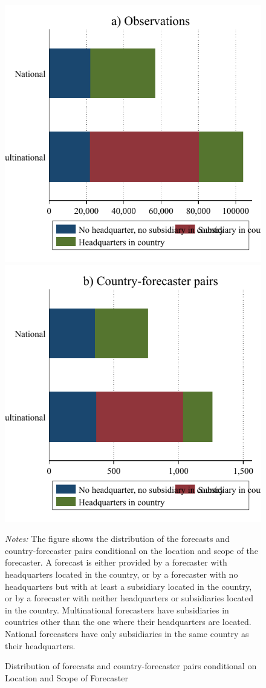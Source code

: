 \documentclass[letterpaper,12pt]{article}
\newenvironment{fignote}{\footnotesize \begin{singlespace} \noindent}{\end{singlespace} \par }
\begin{document}
\begin{figure}[H]
\begin{center}
		\includegraphics[width=.4\linewidth]{../output/figures/hq_sub_obs.pdf}
		\includegraphics[width=.4\linewidth]{../output/figures/hq_sub_pairs.pdf}
\end{center}
	\caption{Distribution of forecasts and country-forecaster pairs conditional on Location and Scope of Forecaster}
	\label{fig:hq_sub_obs}
	\begin{fignote}
		\textit{Notes:} The figure shows the distribution of the forecasts and country-forecaster pairs conditional on the location and scope of the forecaster. A forecast is either provided by a forecaster with headquarters located in the country, or by a forecaster with no headquarters but with at least a subsidiary located in the country, or by a forecaster with neither headquarters or subsidiaries located in the country. Multinational forecasters have subsidiaries in countries other than the one where their headquarters are located. National forecasters have only subsidiaries in the same country as their headquarters.
	\end{fignote}
\end{figure}
\end{document}
